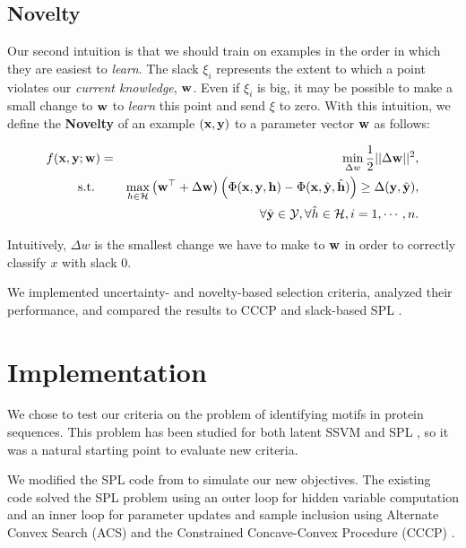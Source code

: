 \documentclass{article}
\newcommand{\mysection}[1]{\vspace{-4mm}\section{#1}\vspace{-4mm}}
\begin{document}
\subsection{Novelty}
Our second intuition is that we should train on examples in the order in which they are easiest to \emph{learn}.  The slack $\xi_i$ represents the extent to which a point violates our \emph{current knowledge}, $\bf w$.  Even if $\xi_i$ is big, it may be possible to make a small change to $\bf w$ to \emph{learn} this point and send $\xi$ to zero.  With this intuition, we define the \textbf{Novelty} of an example $(\bf x, \bf y)$ to a parameter vector $\bf w$ as follows:

\begin{eqnarray}
f(\bf x, \bf y; \bf w) &=&\min_{\Delta w} \frac{1}{2}||{\Delta\bf w}||^2, \nonumber \\
\mbox{s.t. } && \max_{h \in {\cal H}} \left( {\bf w}^\top + \Delta\bf w \right) \left(\Phi({\bf x},{\bf y},{\bf h}) - 
		\Phi({\bf x},\hat{\bf y},\hat{\bf h}) \right)
	 \geq \Delta({\bf y},\hat{\bf y}) , \nonumber \\
\label{eq:novelty}
&&\forall \hat{\bf y} \in {\cal Y}, \forall \hat{h} \in {\cal H}, i=1,\cdots,n.
\end{eqnarray}

Intuitively, $\Delta w$ is the smallest change we have to make to $\bf w$ in order to correctly classify $x$ with slack 0.  

We implemented uncertainty- and novelty-based selection criteria, analyzed their performance, and compared the results to CCCP \cite{SSVM} and slack-based SPL \cite{SPL}.

\mysection{Implementation}
\label{sec:Implementation}
We chose to test our criteria on the problem of identifying motifs in protein sequences.  This problem has been studied for both latent SSVM \cite{SSVM} and SPL \cite{SPL}, so it was a natural starting point to evaluate new criteria.

We modified the SPL code from \cite{SPL} to simulate our new objectives. The existing code solved the SPL problem using an outer loop for hidden variable computation and an inner loop for parameter updates and sample inclusion using Alternate Convex Search ({\sc ACS}) \cite{SPL} and the Constrained Concave-Convex Procedure ({\sc CCCP}) \cite{SSVM}.
\end{document}
